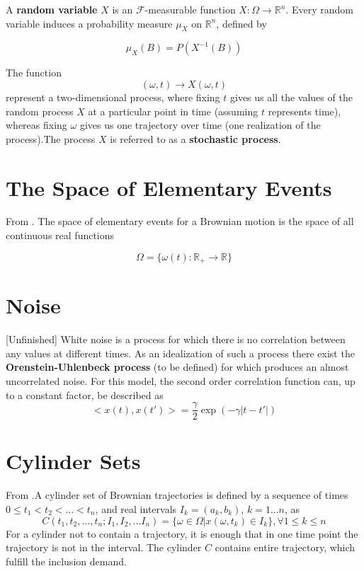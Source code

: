 \documentclass[12pt]{book}
\begin{document}
A \textbf{random variable} $X$ is an $\mathcal{F}$-measurable function $X:\Omega\rightarrow \mathbb{R}^n$. Every random variable induces a probability measure $\mu_X$ on $\mathbb{R}^n$, defined by 

\begin{equation*}
\mu_X(B) = P(X^{-1}(B))
\end{equation*}

The function 
\begin{equation*}
(\omega,t)\rightarrow X(\omega,t)
\end{equation*}
represent a two-dimensional process, where fixing $t$ gives us all the values of the random process $X$ at a particular point in time (assuming $t$ represents time), whereas fixing $\omega$ gives us one trajectory over time (one realization of the process).The process $X$ is referred to as a \textbf{stochastic process}.


\section{The Space of Elementary Events}\label{section_theSpaceOfElementaryEvents}
From \cite{schuss2009theory}. The space of elementary events for a Brownian motion is the space of all continuous real functions 

\begin{equation*}
\Omega=\{\omega(t):\mathbb{R}_+\rightarrow\mathbb{R}\}
\end{equation*}


\section{Noise}[Unfinished]
White noise is a process for which there is no correlation between any values at different times. As an idealization of such a process there exist the \textbf{Orenstein-Uhlenbeck process} (to be defined) for which produces an almost uncorrelated noise. For this model, the second order correlation function can, up to a constant factor, be described as 
\begin{equation*}
<x(t),x(t')>= \frac{\gamma}{2}\exp(-\gamma|t-t'|)
\end{equation*}

\section{Cylinder Sets}
From \cite{schuss2009theory}.A cylinder set of Brownian trajectories is defined by a sequence of times $0\leq t_1<t_2<...<t_n$, and real intervals $I_k=(a_k,b_k)$, $k=1...n$, as 
\begin{equation*}
C(t_1,t_2,...,t_n;I_1,I_2,...I_n)=\{\omega\in \Omega|x(\omega,t_k)\in I_k\},\forall 1\leq k \leq n
\end{equation*}
For a cylinder not to contain a trajectory, it is enough that in one time point the trajectory is not in the interval.
The cylinder $C$ contains entire trajectory, which fulfill the inclusion demand. 
\end{document}
